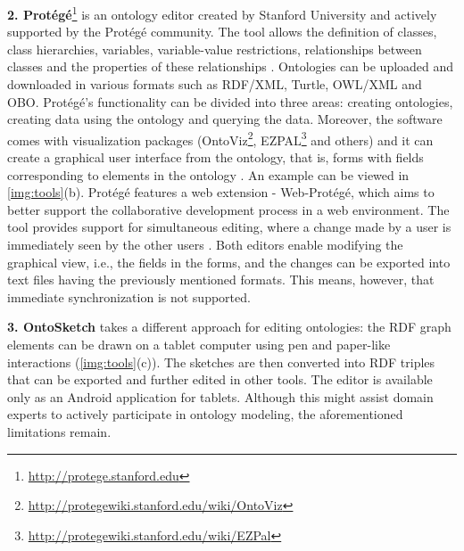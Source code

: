 \textbf{2. Protégé}\footnote{\url{http://protege.stanford.edu}} is an ontology editor created by Stanford University and actively supported by the Protégé community. The tool allows the definition of classes, class hierarchies, variables, variable-value restrictions, relationships between classes and the properties of these relationships \cite{Kapoor2010}. Ontologies can be uploaded and downloaded in various formats such as RDF/XML, Turtle, OWL/XML and OBO. Protégé's functionality can be divided into three areas: creating ontologies, creating data using the ontology and querying the data. Moreover, the software comes with visualization packages (OntoViz\footnote{\url{http://protegewiki.stanford.edu/wiki/OntoViz}}, EZPAL\footnote{\url{http://protegewiki.stanford.edu/wiki/EZPal}} and others) and it can create a graphical user interface from the ontology, that is, forms with fields corresponding to elements in the ontology \cite{Steer2002}. An example can be viewed in \autoref{img:tools}(b). Protégé features a web extension - Web-Protégé, which aims to better support the collaborative development process in a web environment. The tool provides support for simultaneous editing, where a change made by a user is immediately seen by the other users \cite{Tudorache2008}. Both editors enable modifying the graphical view, i.e., the fields in the forms, and the changes can be exported into text files having the previously mentioned formats. This means, however, that immediate synchronization is not supported.

\textbf{3. OntoSketch} \cite{Brade2013} takes a different approach for editing ontologies: the RDF graph elements can be drawn on a tablet computer using pen and paper-like interactions (\autoref{img:tools}(c)). The sketches are then converted into RDF triples that can be exported and further edited in other tools. The editor is available only as an Android application for tablets. Although this might assist domain experts to actively participate in ontology modeling, the aforementioned limitations remain.

